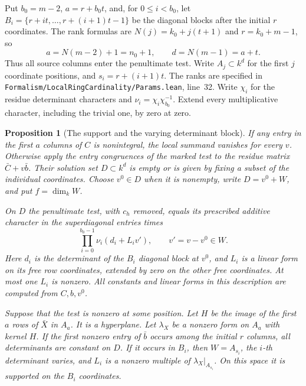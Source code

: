 \documentclass[a4paper,11pt]{article}
\newtheorem{proposition}{Proposition}[section]
\theoremstyle{definition}
\theoremstyle{remark}
\newcommand{\srcloc}[2]{{\small\nolinkurl{#1.lean}}, line~#2}
\numberwithin{equation}{section}
\begin{document}
Put \(b_0=m-2\), \(a=r+b_0t\), and, for \(0\le i<b_0\), let
\(B_i=\{r+it,\ldots,r+(i+1)t-1\}\) be the diagonal blocks
after the initial \(r\) coordinates. The rank formulas are
\(N(j)=k_0+j(t+1)\) and \(r=k_0+m-1\), so
\[
       a=N(m-2)+1=n_0+1,\qquad d=N(m-1)=a+t .
\]
Thus all source columns enter the penultimate test.
Write \(A_j\subset k^d\) for the first \(j\) coordinate
positions, and \(s_i=r+(i+1)t\).
The ranks are specified in
\srcloc{Formalism/LocalRingCardinality/Params}{32}.
Write \(\chi_i\) for the
residue determinant characters and
\(\nu_i=\chi_i\chi_{b_0}^{-1}\). Extend every multiplicative
character, including the trivial one, by zero at zero.

\begin{proposition}[The support and the varying determinant block]
\label{prop:markedcell386}
If any entry in the first \(a\) columns of \(C\) is nonintegral,
the local summand vanishes for every \(v\). Otherwise apply
the entry congruences of the marked test to the residue matrix
\(\bar C+v\bar b\). Their solution set \(D\subset k^d\) is
empty or is given by fixing a subset of the individual
coordinates. Choose \(v^0\in D\) when it is nonempty, write
\(D=v^0+W\), and put \(f=\dim_k W\).

On \(D\) the penultimate test, with \(c_h\) removed, equals
its prescribed additive character in the superdiagonal
entries times
\[
                 \prod_{i=0}^{b_0-1}\nu_i(d_i+L_i v'),
                 \qquad v'=v-v^0\in W .
\]
Here \(d_i\) is the determinant of the \(B_i\) diagonal block
at \(v^0\), and \(L_i\) is a linear form on its free row
coordinates, extended by zero on the other free coordinates.
At most one \(L_i\) is nonzero. All constants and linear
forms in this description are computed from \(C,b,v^0\).

Suppose that the test is nonzero at some position. Let \(H\)
be the image of the first \(a\) rows of \(\bar X\) in \(A_a\).
It is a hyperplane. Let \(\lambda_X\) be a nonzero form on
\(A_a\) with kernel \(H\). If the first nonzero entry of
\(\bar b\) occurs among the initial \(r\) columns, all
determinants are constant on \(D\). If it occurs in \(B_i\),
then \(W=A_{s_i}\), the \(i\)-th determinant varies, and
\(L_i\) is a nonzero multiple of \(\lambda_X|_{A_{s_i}}\).
On this space it is supported on the \(B_i\) coordinates.
\end{proposition}
\end{document}
